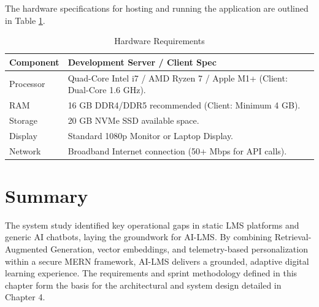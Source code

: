 The hardware specifications for hosting and running the application are outlined in Table \ref{tab:hw_req}.

\begin{table}[H]
\centering
\caption{Hardware Requirements}
\label{tab:hw_req}
\begin{tabular}{p{} p{}}
\toprule
\textbf{Component} & \textbf{Development Server / Client Spec} \\
\midrule
Processor & Quad-Core Intel i7 / AMD Ryzen 7 / Apple M1+ (Client: Dual-Core 1.6 GHz). \\
RAM & 16 GB DDR4/DDR5 recommended (Client: Minimum 4 GB). \\
Storage & 20 GB NVMe SSD available space. \\
Display & Standard 1080p Monitor or Laptop Display. \\
Network & Broadband Internet connection (50+ Mbps for API calls). \\
\bottomrule
\end{tabular}
\end{table}

\section{Summary}

The system study identified key operational gaps in static LMS platforms and generic AI chatbots, laying the groundwork for AI-LMS. By combining Retrieval-Augmented Generation, vector embeddings, and telemetry-based personalization within a secure MERN framework, AI-LMS delivers a grounded, adaptive digital learning experience. The requirements and sprint methodology defined in this chapter form the basis for the architectural and system design detailed in Chapter 4.
